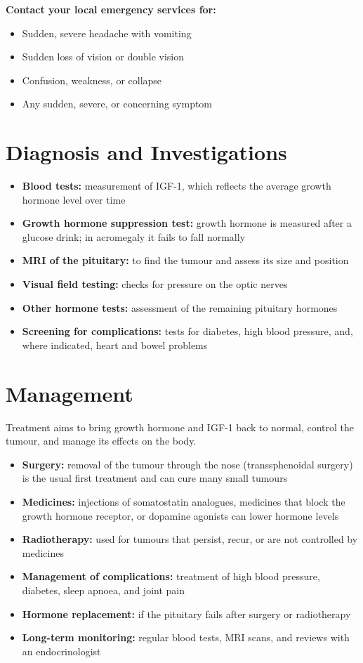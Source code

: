 \textbf{Contact your local emergency services for:}
\begin{itemize}
    \item Sudden, severe headache with vomiting
    \item Sudden loss of vision or double vision
    \item Confusion, weakness, or collapse
    \item Any sudden, severe, or concerning symptom
\end{itemize}

\section*{Diagnosis and Investigations}
\begin{itemize}
    \item \textbf{Blood tests:} measurement of IGF-1, which reflects the average growth hormone level over time
    \item \textbf{Growth hormone suppression test:} growth hormone is measured after a glucose drink; in acromegaly it fails to fall normally
    \item \textbf{MRI of the pituitary:} to find the tumour and assess its size and position
    \item \textbf{Visual field testing:} checks for pressure on the optic nerves
    \item \textbf{Other hormone tests:} assessment of the remaining pituitary hormones
    \item \textbf{Screening for complications:} tests for diabetes, high blood pressure, and, where indicated, heart and bowel problems
\end{itemize}

\section*{Management}
Treatment aims to bring growth hormone and IGF-1 back to normal, control the tumour, and manage its effects on the body.

\begin{itemize}
    \item \textbf{Surgery:} removal of the tumour through the nose (transsphenoidal surgery) is the usual first treatment and can cure many small tumours
    \item \textbf{Medicines:} injections of somatostatin analogues, medicines that block the growth hormone receptor, or dopamine agonists can lower hormone levels
    \item \textbf{Radiotherapy:} used for tumours that persist, recur, or are not controlled by medicines
    \item \textbf{Management of complications:} treatment of high blood pressure, diabetes, sleep apnoea, and joint pain
    \item \textbf{Hormone replacement:} if the pituitary fails after surgery or radiotherapy
    \item \textbf{Long-term monitoring:} regular blood tests, MRI scans, and reviews with an endocrinologist
\end{itemize}

